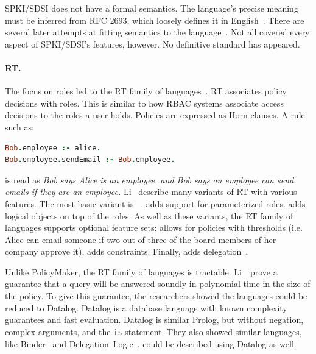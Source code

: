 \documentclass[thesis.tex]{subfiles}
\begin{document}
SPKI/SDSI does not have a formal semantics.  The language's precise
meaning must be inferred from RFC 2693, which loosely defines it in
English~\cite{ellison_spki_1999}. There are several later attempts at
fitting semantics to the
language~\cite{joseph_y._halpern_logic_1999,abadi_sdsis_1998,howell_formal_2000,dwaine_clarke_certificate_2001}.
Not all covered every aspect of SPKI/SDSI's features, however. No
definitive standard has appeared.

\paragraph*{RT.}
The focus on roles led to the RT family of
languages~\cite{ninghui_li_design_2002}. RT associates policy
decisions with roles. This is similar to how \ac{RBAC} systems associate access
decisions to the roles a user holds.  Policies are expressed as Horn
clauses.  A rule such as:

\begin{lstlisting}[language=prolog]
Bob.employee :- alice.
Bob.employee.sendEmail :- Bob.employee.
\end{lstlisting}

\noindent is read as \emph{Bob says Alice is an employee, and Bob says
an employee can send emails if they are an employee.}  Li~\etal{}
describe many variants of RT with various features.  The most basic
variant is ~\cite{li_distributed_2003}.  adds support
for parameterized roles.  adds logical objects on top of the
roles.  As well as these variants, the RT family of languages supports
optional feature sets:  allows for policies with thresholds
(i.e. Alice can email someone if two out of three of the board members
of her company approve it).  adds constraints. Finally,
 adds delegation~\cite{ninghui_li_design_2002}.

Unlike PolicyMaker, the RT family of languages is
tractable. Li~\etal~prove a guarantee that a query will be answered
soundly in polynomial time in the size of the policy. To give this
guarantee, the researchers showed the languages could be reduced to
Datalog. Datalog is a database language with known complexity
guarantees and fast evaluation. Datalog is similar Prolog, but without negation, complex arguments, and the \texttt{is} statement. They also showed
similar languages, like Binder~\cite{detreville_binder_2002} and
Delegation~Logic~\cite{li_delegation_2003,li_practically_2000}, could
be described using Datalog as well.
\end{document}
